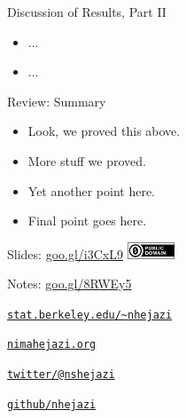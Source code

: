 \documentclass[12pt,t]{beamer}
\begin{document}
\begin{frame}[c]{Discussion of Results, Part II}

\begin{center}
\begin{itemize}
  \item ...
  \item ...
\end{itemize}
\end{center}


\end{frame}



\begin{frame}[c]{Review: Summary}

\begin{center}
\begin{itemize}
  \itemsep12pt
  \item Look, we proved this above.
  \item More stuff we proved.
  \item Yet another point here.
  \item Final point goes here.
\end{itemize}
\end{center}


\end{frame}



\begin{frame}[c]{}

\Large
Slides: \href{https://goo.gl/i3CxL9}{goo.gl/i3CxL9} \quad
\includegraphics[height=5mm]{Figs/cc-zero.png}

\vspace{5mm}

Notes: \href{https://goo.gl/8RWEy5}{goo.gl/8RWEy5}

\vspace{5mm}

\href{https://www.stat.berkeley.edu/~nhejazi}{\tt stat.berkeley.edu/\textasciitilde{}nhejazi}

\vspace{5mm}

\href{http://nimahejazi.org}{\tt nimahejazi.org}

\vspace{5mm}

\href{https://twitter.com/nshejazi}{\tt twitter/@nshejazi}

\vspace{5mm}

\href{https://github.com/nhejazi}{\tt github/nhejazi}


\end{frame}
\end{document}

